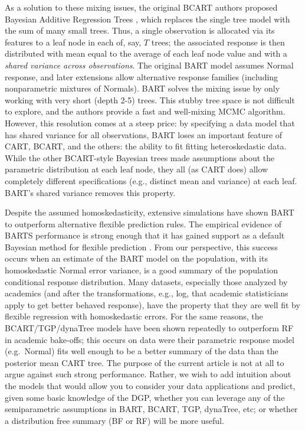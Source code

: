 \documentclass{article}
\begin{document}
As a solution to these mixing issues, the original BCART authors
proposed Bayesian Additive Regression Trees \cite{chipman_bart:_2010},
which replaces the single tree model with the sum of many small trees.
Thus, a single observation is allocated via its features to a leaf node
in each of, say, $T$ trees; the associated response is then distributed
with mean equal to the average of each leaf node value and with a
\emph{shared variance across observations}. The original BART model
assumes Normal response, and later extensions allow alternative response
families (including nonparametric mixtures of Normals). BART solves the
mixing issue by only working with very short (depth 2-5) trees. This
stubby tree space is not difficult to explore, and the authors provide a
fast and well-mixing MCMC algorithm. However, this resolution comes at a
steep price: by specifying a data model that has shared variance for all
observations, BART loses an important feature of CART, BCART, and the
others: the ability to fit fitting heteroskedastic data. While the other
BCART-style Bayesian trees made assumptions about the parametric
distribution at each leaf node, they all (as CART does) allow completely
different specifications (e.g., distinct mean and variance) at each
leaf. BART's shared variance removes this property.

Despite the assumed homoskedasticity, extensive simulations have shown
BART to outperform alternative flexible prediction rules. The empirical
evidence of BARTS performance is strong enough that it has gained
support as a default Bayesian method for flexible prediction
\cite{hill_bayesian_2011}. From our perspective, this success occurs
when an estimate of the BART model on the population, with its
homoskedastic Normal error variance, is a good summary of the population
conditional response distribution. Many datasets, especially those
analyzed by academics (and after the transformations, e.g., log, that
academic statisticians apply to get better behaved response), have the
property that they are well fit by flexible regression with
homoskedastic errors. For the same reasons, the BCART/TGP/dynaTree
models have been shown repeatedly to outperform RF in academic
bake-offs; this occurs on data were their parametric response model
(e.g.~Normal) fits well enough to be a better summary of the data than
the posterior mean CART tree. The purpose of the current article is not
at all to argue against such strong performance. Rather, we wish to add
intuition about the models that would allow you to consider your data
applications and predict, given some basic knowledge of the DGP, whether
you can leverage any of the semiparametric assumptions in BART, BCART,
TGP, dynaTree, etc; or whether a distribution free summary (BF or RF)
will be more useful.
\end{document}
